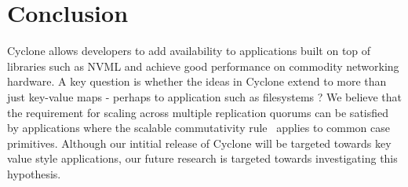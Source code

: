 \documentclass[letterpaper,twocolumn,10pt]{article}
\begin{document}
\section{Conclusion}
Cyclone allows developers to add availability to applications built on top of
libraries such as NVML and achieve good performance on commodity networking
hardware. A key question is whether the ideas in Cyclone extend to more than
just key-value maps - perhaps to application such as filesystems ? We believe
that the requirement for scaling across multiple replication quorums can be
satisfied by applications where the scalable commutativity
rule~\cite{scalable_commutativity} applies to common case primitives. Although
our intitial release of Cyclone will be targeted towards key value style
applications, our future research is targeted towards investigating this
hypothesis.
\newcommand\myurl[2]{\url{#1}}


\end{document}
